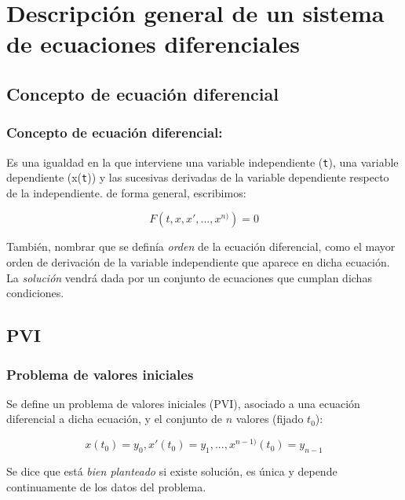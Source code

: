 \documentclass{beamer}
\begin{document}
\section{Descripción general de un sistema de ecuaciones diferenciales}
\subsection{Concepto de ecuación diferencial}
\begin{frame}
	\frametitle{Concepto de ecuación diferencial:}
	
	Es una igualdad en la que interviene una variable independiente (\texttt{t}), una variable dependiente (x(\texttt{t})) y las sucesivas derivadas de la variable dependiente respecto de la independiente. de forma general, escribimos: 
	
	$$
	F(t,x,x', ..., x^{n)})=0
	$$
	
	También, nombrar que se definía \textit{orden} de la ecuación diferencial, como el mayor orden de derivación de la variable independiente que aparece en dicha ecuación.\\
	
	La \textit{solución} vendrá dada por un conjunto de ecuaciones que cumplan dichas condiciones.
\end{frame}

\subsection{PVI}
\begin{frame}
	\frametitle{Problema de valores iniciales}
	Se define un problema de valores iniciales (PVI), asociado a una ecuación diferencial a dicha ecuación, y el conjunto de $n$ valores (fijado $t_0$):
	
	$$
	x(t_0)=y_0, x'(t_0)=y_1, ...,  x^{n-1)}(t_0)=y_{n-1}
	$$
	
	Se dice que está \textit{bien planteado} si existe solución, es única y depende continuamente de los datos del problema.
	
\end{frame}
\end{document}
